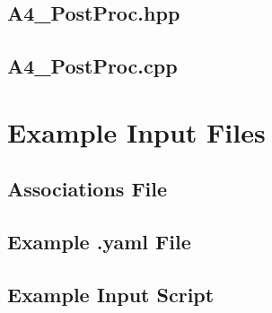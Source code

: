 \documentclass[a4paper, 12pt]{article}
\begin{document}
\subsection{A4\_PostProc.hpp} \label{subsec:PostProc.hpp}


\subsection{A4\_PostProc.cpp} \label{subsec:PostProc.cpp}


\newpage
\section{Example Input Files}\label{sec:ExInput}

\subsection{Associations File} \label{subsec:ExAssoc}


\subsection{Example .yaml File} \label{subsec:ExYaml}


\subsection{Example Input Script} \label{subsec:ExIn}

\end{document}
